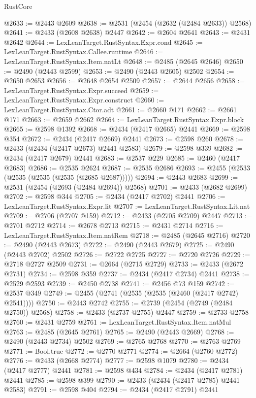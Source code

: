 \begin{lexlean}{RustCore}
\begin{coremodule}
@2633 := @2443 @2609
@2638 := @2531 (@2454 (@2632 (@2484 @2633)) @2568)
@2641 := @2433 (@2608 @2638) @2447
@2642 := @2604 @2641
@2643 := @2431 @2642
@2644 := LexLeanTarget.RustSyntax.Expr.cond
@2645 := LexLeanTarget.RustSyntax.Callee.runtime
@2646 := LexLeanTarget.RustSyntax.Item.natLt
@2648 := @2485 (@2645 @2646)
@2650 := @2490 (@2443 @2599)
@2653 := @2490 (@2443 @2605) @2502
@2654 := @2650 @2653
@2656 := @2648 @2654 @2509
@2657 := @2644 @2656
@2658 := LexLeanTarget.RustSyntax.Expr.succeed
@2659 := LexLeanTarget.RustSyntax.Expr.construct
@2660 := LexLeanTarget.RustSyntax.Ctor.adt
@2661 := @2660 @171
@2662 := @2661 @171
@2663 := @2659 @2662
@2664 := LexLeanTarget.RustSyntax.Expr.block
@2665 := @2598 @1392
@2668 := @2434 (@2417 @2665) @2441
@2669 := @2598 @354
@2672 := @2434 (@2417 @2669) @2441
@2673 := @2598 @260
@2678 := @2433 (@2434 (@2417 @2673) @2441 @2583)
@2679 := @2598 @339
@2682 := @2434 (@2417 @2679) @2441
@2683 := @2537 @229
@2685 := @2460 (@2417 @2683)
@2686 := @2535 @2624
@2687 := @2535 @2686
@2693 := @2455 (@2533 (@2535 (@2535 (@2535 (@2685 @2687)))))
@2694 := @2443 @2683
@2699 := @2531 (@2454 (@2693 (@2484 @2694)) @2568)
@2701 := @2433 (@2682 @2699)
@2702 := @2598 @344
@2705 := @2434 (@2417 @2702) @2441
@2706 := LexLeanTarget.RustSyntax.Expr.lit
@2707 := LexLeanTarget.RustSyntax.Lit.nat
@2709 := @2706 (@2707 @159)
@2712 := @2433 (@2705 @2709) @2447
@2713 := @2701 @2712
@2714 := @2678 @2713
@2715 := @2431 @2714
@2716 := LexLeanTarget.RustSyntax.Item.natRem
@2718 := @2485 (@2645 @2716)
@2720 := @2490 (@2443 @2673)
@2722 := @2490 (@2443 @2679)
@2725 := @2490 (@2443 @2702) @2502
@2726 := @2722 @2725
@2727 := @2720 @2726
@2729 := @2718 @2727 @2509
@2731 := @2664 (@2715 @2729)
@2733 := @2433 (@2672 @2731)
@2734 := @2598 @359
@2737 := @2434 (@2417 @2734) @2441
@2738 := @2529 @2593
@2739 := @2450 @2738
@2741 := @2456 @73 @159
@2742 := @2537 @349
@2749 := @2455 (@2741 (@2535 (@2535 (@2460 (@2417 @2742) @2541))))
@2750 := @2443 @2742
@2755 := @2739 (@2454 (@2749 (@2484 @2750)) @2568)
@2758 := @2433 (@2737 @2755) @2447
@2759 := @2733 @2758
@2760 := @2431 @2759
@2761 := LexLeanTarget.RustSyntax.Item.natMul
@2763 := @2485 (@2645 @2761)
@2765 := @2490 (@2443 @2669)
@2768 := @2490 (@2443 @2734) @2502
@2769 := @2765 @2768
@2770 := @2763 @2769
@2771 := Bool.true
@2772 := @2770 @2771
@2774 := @2664 (@2760 @2772)
@2776 := @2433 (@2668 @2774)
@2777 := @2598 @1079
@2780 := @2434 (@2417 @2777) @2441
@2781 := @2598 @434
@2784 := @2434 (@2417 @2781) @2441
@2785 := @2598 @399
@2790 := @2433 (@2434 (@2417 @2785) @2441 @2583)
@2791 := @2598 @404
@2794 := @2434 (@2417 @2791) @2441

\end{coremodule}
\end{lexlean}
